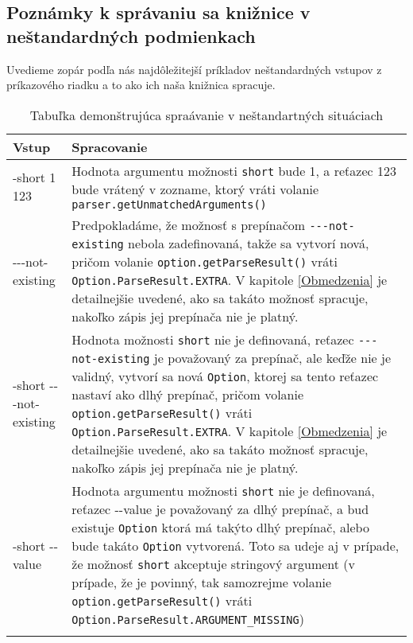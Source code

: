 \documentclass{article}
\begin{document}
\subsection{Poznámky k správaniu sa knižnice v neštandardných podmienkach}
Uvedieme zopár podľa nás najdôležitejší príkladov neštandardných vstupov z príkazového riadku a to ako ich naša knižnica spracuje.
\begin{longtable}{|p{}|p{}|}
     \hline
     \textbf{Vstup} & \textbf{Spracovanie} \\
     \hline
     -short 1 123 & Hodnota argumentu možnosti \texttt{short} bude 1, a reťazec 123 bude vrátený v zozname, ktorý vráti volanie \texttt{parser.getUnmatchedArguments()} \\
     \hline
     -{}-{}-not-existing & Predpokladáme, že možnosť s prepínačom \texttt{-{}-{}-{}not-existing} nebola zadefinovaná, takže sa vytvorí nová, pričom volanie \texttt{option.getParseResult()} vráti \texttt{Option.ParseResult.EXTRA}. V kapitole \ref{Obmedzenia} je detailnejšie uvedené, ako sa takáto možnosť spracuje, nakoľko zápis jej prepínača nie je platný. \\
     \hline
     -short -{}-{}-not-existing & Hodnota možnosti \texttt{short} nie je definovaná, reťazec \texttt{-{}-{}-{}not-existing} je považovaný za prepínač, ale keďže nie je validný, vytvorí sa nová \texttt {Option}, ktorej sa tento reťazec nastaví ako dlhý prepínač, pričom volanie \texttt{option.getParseResult()} vráti \texttt{Option.ParseResult.EXTRA}. V kapitole \ref{Obmedzenia} je detailnejšie uvedené, ako sa takáto možnosť spracuje, nakoľko zápis jej prepínača nie je platný. \\
     \hline
     -short -{}-value & Hodnota argumentu možnosti \texttt{short} nie je definovaná, reťazec -{}-value je považovaný za dlhý prepínač, a bud existuje \texttt{Option} ktorá má takýto dlhý prepínač, alebo bude takáto \texttt{Option} vytvorená. Toto sa udeje aj v prípade, že možnosť \texttt{short} akceptuje stringový argument (v prípade, že je povinný, tak samozrejme volanie \texttt{option.getParseResult()} vráti \texttt{Option.ParseResult.ARGUMENT\_MISSING}) \\
     \hline
\caption{Tabuľka demonštrujúca spraávanie v neštandartných situáciach}
\end{longtable}
\end{document}
